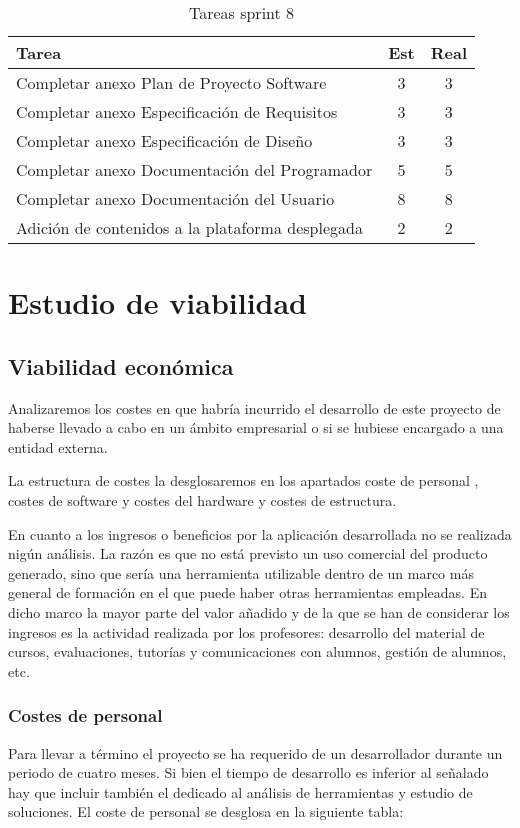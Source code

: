 \begin{table}[H]
\begin{center}
\begin{tabular}{| l | c | c |}
\textbf{Tarea}                   & \textbf{Est} & \textbf{Real} \\ \hline
Completar anexo Plan de Proyecto Software & 3 & 3 \\
Completar anexo Especificación de Requisitos & 3 & 3 \\
Completar anexo Especificación de Diseño & 3 & 3 \\ 
Completar anexo Documentación del Programador & 5 & 5 \\
Completar anexo Documentación del Usuario & 8 & 8 \\ 
Adición de contenidos a la plataforma desplegada & 2 & 2\\\hline
\end{tabular}
\caption{Tareas sprint 8}
\label{tab:sprint}
\end{center}
\end{table}



\section{Estudio de viabilidad}

\subsection{Viabilidad económica}
Analizaremos los costes en que habría incurrido el desarrollo de este proyecto de haberse
llevado a cabo en un ámbito empresarial o si se hubiese encargado a una entidad externa.

La estructura de costes la desglosaremos en los apartados coste de personal , costes de
software y costes del hardware y costes de estructura.

En cuanto a los ingresos o beneficios por la aplicación desarrollada no se realizada nigún
análisis. La razón es que no está previsto un uso comercial del producto generado, sino que
sería una herramienta utilizable dentro de un marco más general de formación en el que puede
haber otras herramientas empleadas. En dicho marco la mayor parte del valor añadido y de la
que se han de considerar los ingresos es la actividad realizada por los profesores: desarrollo del material de cursos, evaluaciones, tutorías y comunicaciones con alumnos, gestión de alumnos, etc.

\subsubsection{Costes de personal}
Para llevar a término el proyecto se ha requerido de un desarrollador durante un periodo de
cuatro meses. Si bien el tiempo de desarrollo es inferior al señalado hay que incluir también el dedicado al análisis de herramientas y estudio de soluciones. El coste de personal se desglosa en la siguiente tabla:

